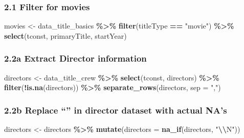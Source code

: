 \documentclass[
]{article}
\newenvironment{Shaded}{\begin{snugshade}}{\end{snugshade}}
\newcommand{\AttributeTok}[1]{\textcolor[rgb]{0.13,0.29,0.53}{#1}}
\newcommand{\FunctionTok}[1]{\textcolor[rgb]{0.13,0.29,0.53}{\textbf{#1}}}
\newcommand{\NormalTok}[1]{#1}
\newcommand{\OtherTok}[1]{\textcolor[rgb]{0.56,0.35,0.01}{#1}}
\newcommand{\SpecialCharTok}[1]{\textcolor[rgb]{0.81,0.36,0.00}{\textbf{#1}}}
\newcommand{\StringTok}[1]{\textcolor[rgb]{0.31,0.60,0.02}{#1}}
\begin{document}
\subsubsection{2.1 Filter for movies}\label{filter-for-movies}

\begin{Shaded}
\begin{Highlighting}[]
\NormalTok{movies }\OtherTok{\textless{}{-}}\NormalTok{ data\_title\_basics }\SpecialCharTok{\%\textgreater{}\%}
  \FunctionTok{filter}\NormalTok{(titleType }\SpecialCharTok{==} \StringTok{"movie"}\NormalTok{) }\SpecialCharTok{\%\textgreater{}\%}
  \FunctionTok{select}\NormalTok{(tconst, primaryTitle, startYear)}
\end{Highlighting}
\end{Shaded}

\subsubsection{2.2a Extract Director
information}\label{a-extract-director-information}

\begin{Shaded}
\begin{Highlighting}[]
\NormalTok{directors }\OtherTok{\textless{}{-}}\NormalTok{ data\_title\_crew }\SpecialCharTok{\%\textgreater{}\%}
  \FunctionTok{select}\NormalTok{(tconst, directors) }\SpecialCharTok{\%\textgreater{}\%}
  \FunctionTok{filter}\NormalTok{(}\SpecialCharTok{!}\FunctionTok{is.na}\NormalTok{(directors)) }\SpecialCharTok{\%\textgreater{}\%}
  \FunctionTok{separate\_rows}\NormalTok{(directors, }\AttributeTok{sep =} \StringTok{","}\NormalTok{)}
\end{Highlighting}
\end{Shaded}

\subsubsection{\texorpdfstring{2.2b Replace ``\N'' in director dataset
with actual
NA's}{2.2b Replace ``\,'' in director dataset with actual NA's}}\label{b-replace-in-director-dataset-with-actual-nas}

\begin{Shaded}
\begin{Highlighting}[]
\NormalTok{directors }\OtherTok{\textless{}{-}}\NormalTok{ directors }\SpecialCharTok{\%\textgreater{}\%}
  \FunctionTok{mutate}\NormalTok{(}\AttributeTok{directors =} \FunctionTok{na\_if}\NormalTok{(directors, }\StringTok{"}\SpecialCharTok{\textbackslash{}\textbackslash{}}\StringTok{N"}\NormalTok{))}
\end{Highlighting}
\end{Shaded}
\end{document}
